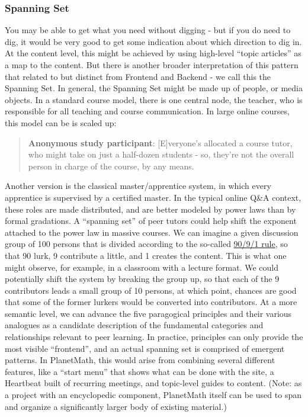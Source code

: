 \subsubsection{Spanning Set}

You may be able to get what you need without digging - but if you do
need to dig, it would be very good to get some indication about which
direction to dig in. At the content level, this might be achieved by
using high-level ``topic articles'' as a map to the content. But there
is another broader interpretation of this pattern that related to but
distinct from Frontend and Backend - we call this the Spanning Set. In
general, the Spanning Set might be made up of people, or media objects.
In a standard course model, there is one central node, the teacher, who
is responsible for all teaching and course communication. In large
online courses, this model can be is scaled up:

\begin{quote}
\textbf{Anonymous study participant}: {[}E{]}veryone's allocated a
course tutor, who might take on just a half-dozen students - so, they're
not the overall person in charge of the course, by any means.
\end{quote}
Another version is the classical master/apprentice system, in which
every apprentice is supervised by a certified master. In the typical
online Q\&A context, these roles are made distributed, and are better
modeled by power laws than by formal gradations. A ``spanning set'' of
peer tutors could help shift the exponent attached to the power law in
massive courses. We can imagine a given discussion group of 100 persons
that is divided according to the so-called
\href{http://www.wikipatterns.com/display/wikipatterns/90-9-1+Theory}{90/9/1
rule}, so that 90 lurk, 9 contribute a little, and 1 creates the
content. This is what one might observe, for example, in a classroom
with a lecture format. We could potentially shift the system by breaking
the group up, so that each of the 9 contributors leads a small group of
10 persons, at which point, chances are good that some of the former
lurkers would be converted into contributors. At a more semantic level,
we can advance the five paragogical principles and their various
analogues as a candidate description of the fundamental categories and
relationships relevant to peer learning. In practice, principles can
only provide the most visible ``frontend'', and an actual spanning set
is comprised of emergent patterns. In PlanetMath, this would arise from
combining several different features, like a ``start menu'' that shows
what can be done with the site, a Heartbeat built of recurring meetings,
and topic-level guides to content. (Note: as a project with an
encyclopedic component, PlanetMath itself can be used to span and
organize a significantly larger body of existing material.)

